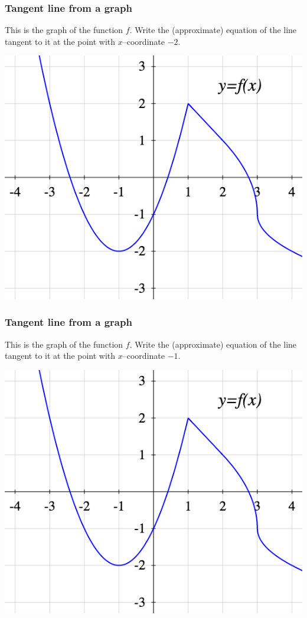 \documentclass[14pt]{beamer}
\begin{document}
\begin{frame}[t]
\frametitle{Tangent line from a graph}
	This is the graph of the function $f$.  Write the (approximate)
	equation of the line tangent to it at the point with $x$--coordinate $-2$.
\begin{center}
\includegraphics[scale=.4]{G4}
\end{center}

\end{frame}
\begin{frame}[t]
\frametitle{Tangent line from a graph}
	This is the graph of the function $f$.  Write the (approximate)
	equation of the line tangent to it at the point with $x$--coordinate $-1$.
\begin{center}
\includegraphics[scale=.4]{G4}
\end{center}

\end{frame}
\end{document}

